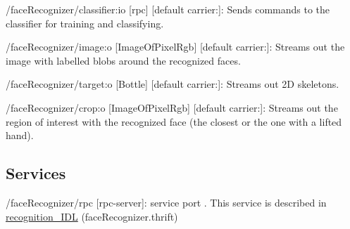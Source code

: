 \begin{DoxyItemize}
\item /face\+Recognizer/classifier\+:io \mbox{[}rpc\mbox{]} \mbox{[}default carrier\+:\mbox{]}\+: Sends commands to the classifier for training and classifying.
\item /face\+Recognizer/image\+:o \mbox{[}Image\+Of\+Pixel\+Rgb\mbox{]} \mbox{[}default carrier\+:\mbox{]}\+: Streams out the image with labelled blobs around the recognized faces.
\item /face\+Recognizer/target\+:o \mbox{[}Bottle\mbox{]} \mbox{[}default carrier\+:\mbox{]}\+: Streams out 2D skeletons.
\item /face\+Recognizer/crop\+:o \mbox{[}Image\+Of\+Pixel\+Rgb\mbox{]} \mbox{[}default carrier\+:\mbox{]}\+: Streams out the region of interest with the recognized face (the closest or the one with a lifted hand).
\end{DoxyItemize}\hypertarget{group__skeletonViewer_services_sec}{}\subsection{Services}\label{group__skeletonViewer_services_sec}

\begin{DoxyItemize}
\item /face\+Recognizer/rpc \mbox{[}rpc-\/server\mbox{]}\+: service port . This service is described in \mbox{\hyperlink{classrecognition__IDL}{recognition\+\_\+\+I\+DL}} (face\+Recognizer.\+thrift) 
\end{DoxyItemize}
